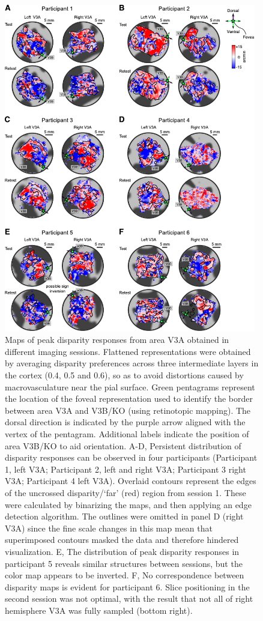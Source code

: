 \begin{figure}
  \centering
  \includegraphics[width=11cm, keepaspectratio]{fig4}
  \caption[Maps of peak disparity responses from area V3A.]{Maps of peak disparity responses from area V3A obtained in different imaging sessions. Flattened representations were obtained by averaging disparity preferences across three intermediate layers in the cortex (0.4, 0.5 and 0.6), so as to avoid distortions caused by macrovasculature near the pial surface. Green pentagrams represent the location of the foveal representation used to identify the border between area V3A and V3B/KO (using retinotopic mapping). The dorsal direction is indicated by the purple arrow aligned with the vertex of the pentagram. Additional labels indicate the position of area V3B/KO to aid orientation. A-D, Persistent distribution of disparity responses can be observed in four participants (Participant 1, left V3A; Participant 2, left and right V3A; Participant 3 right V3A; Participant 4 left V3A). Overlaid contours represent the edges of the uncrossed disparity/`far' (red) region from session 1. These were calculated by binarizing the maps, and then applying an edge detection algorithm. The outlines were omitted in panel D (right V3A) since the fine scale changes in this map mean that superimposed contours masked the data and therefore hindered visualization. E, The distribution of peak disparity responses in participant 5 reveals similar structures between sessions, but the color map appears to be inverted. F, No correspondence between disparity maps is evident for participant 6. Slice positioning in the second session was not optimal, with the result that not all of right hemisphere V3A was fully sampled (bottom right).}
  \label{fig:ch4fig4}
\end{figure}

